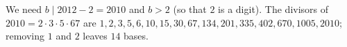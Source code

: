 We need $b\mid 2012-2=2010$ and $b>2$ (so that $2$ is a digit). The divisors of $2010=2\cdot3\cdot5\cdot67$ are $1,2,3,5,6,10,15,30,67,134,201,335,402,670,1005,2010$; removing $1$ and $2$ leaves $\boxed{14}$ bases.
